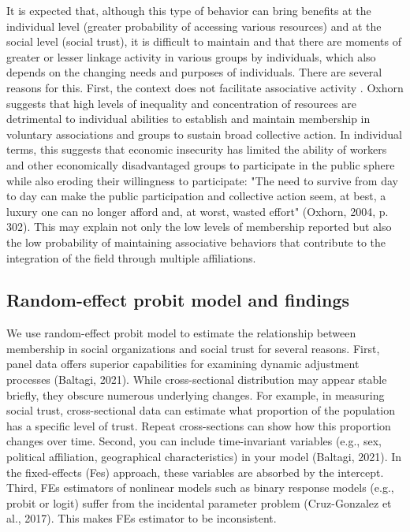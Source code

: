 It is expected that, although this type of behavior can bring benefits at the individual level (greater probability of accessing various resources) and at the social level (social trust), it is difficult to maintain and that there are moments of greater or lesser linkage activity in various groups by individuals, which also depends on the changing needs and purposes of individuals. There are several reasons for this. First, the context does not facilitate associative activity \parencite{oxhorn_neopluralism_2004}. Oxhorn \parencite*{oxhorn_neopluralism_2004} suggests that high levels of inequality and concentration of resources are detrimental to individual abilities to establish and maintain membership in voluntary associations and groups to sustain broad collective action. In individual terms, this suggests that economic insecurity has limited the ability of workers and other economically disadvantaged groups to participate in the public sphere while also eroding their willingness to participate: "The need to survive from day to day can make the public participation and collective action seem, at best, a luxury one can no longer afford and, at worst, wasted effort" (Oxhorn, 2004, p. 302). This may explain not only the low levels of membership reported but also the low probability of maintaining associative behaviors that contribute to the integration of the field through multiple affiliations.


\subsection{Random-effect probit model and findings}
We use random-effect probit model to estimate the relationship between membership in social organizations and social trust for several reasons. First, panel data offers superior capabilities for examining dynamic adjustment processes (Baltagi, 2021). While cross-sectional distribution may appear stable briefly, they obscure numerous underlying changes. For example, in measuring social trust, cross-sectional data can estimate what proportion of the population has a specific level of trust. Repeat cross-sections can show how this proportion changes over time. Second, you can include time-invariant variables (e.g., sex, political affiliation, geographical characteristics) in your model (Baltagi, 2021). In the fixed-effects (Fes) approach, these variables are absorbed by the intercept. Third, FEs estimators of nonlinear models such as binary response models (e.g., probit or logit) suffer from the incidental parameter problem (Cruz-Gonzalez et al., 2017). This makes FEs estimator to be inconsistent. \\

